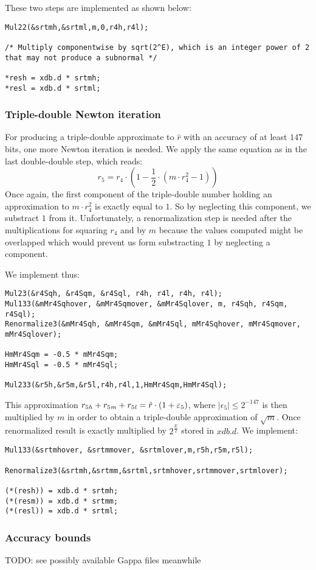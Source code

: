 These two steps are implemented as shown below:
\begin{lstlisting}[caption={Multiplication $m \cdot \hat{r}$, reconstruction},firstnumber=1]
Mul22(&srtmh,&srtml,m,0,r4h,r4l);

/* Multiply componentwise by sqrt(2^E), which is an integer power of 2 that may not produce a subnormal */

*resh = xdb.d * srtmh;
*resl = xdb.d * srtml;
\end{lstlisting}

\subsubsection{Triple-double Newton iteration}
For producing a triple-double approximate to $\hat{r}$ with an
accuracy of at least $147$ bits, one more Newton iteration is
needed. We apply the same equation as in the last double-double step,
which reads:
$$r_5 = r_4 \cdot \left( 1 - \frac{1}{2} \cdot \left( m \cdot r_4^2 -
1 \right) \right)$$ Once again, the first component of the
triple-double number holding an approximation to $m \cdot r_4^2$ is
exactly equal to $1$. So by neglecting this component, we substract $1$ from it.
Unfortunately, a renormalization step is needed after the multiplications for
squaring $r_4$ and by $m$ because the values computed might be overlapped which would prevent us
form substracting $1$ by neglecting a component.

We implement thus:
\begin{lstlisting}[caption={Newton iteration - triple-double step},firstnumber=1]
Mul23(&r4Sqh, &r4Sqm, &r4Sql, r4h, r4l, r4h, r4l);
Mul133(&mMr4Sqhover, &mMr4Sqmover, &mMr4Sqlover, m, r4Sqh, r4Sqm, r4Sql);
Renormalize3(&mMr4Sqh, &mMr4Sqm, &mMr4Sql, mMr4Sqhover, mMr4Sqmover, mMr4Sqlover);

HmMr4Sqm = -0.5 * mMr4Sqm;
HmMr4Sql = -0.5 * mMr4Sql;

Mul233(&r5h,&r5m,&r5l,r4h,r4l,1,HmMr4Sqm,HmMr4Sql);
\end{lstlisting}

This approximation $r_{5\mathit{h}} + r_{5\mathit{m}} + r_{5\mathit{l}} = \hat{r} \cdot
\left( 1 + \varepsilon_5 \right)$, where $\left \vert \epsilon_5 \right
\vert \leq 2^{-147}$ is then multiplied by $m$ in order to obtain a
triple-double approximation of $\sqrt{m}$. Once renormalized result is
exactly multiplied by $2^{\frac{E}{2}}$ stored in $xdb.d$.  We
implement:
\begin{lstlisting}[caption={Newton iteration - triple-double step},firstnumber=1]
Mul133(&srtmhover, &srtmmover, &srtmlover,m,r5h,r5m,r5l);

Renormalize3(&srtmh,&srtmm,&srtml,srtmhover,srtmmover,srtmlover);

(*(resh)) = xdb.d * srtmh;
(*(resm)) = xdb.d * srtmm;
(*(resl)) = xdb.d * srtml;
\end{lstlisting}

\subsubsection{Accuracy bounds}

TODO: see possibly available Gappa files meanwhile



